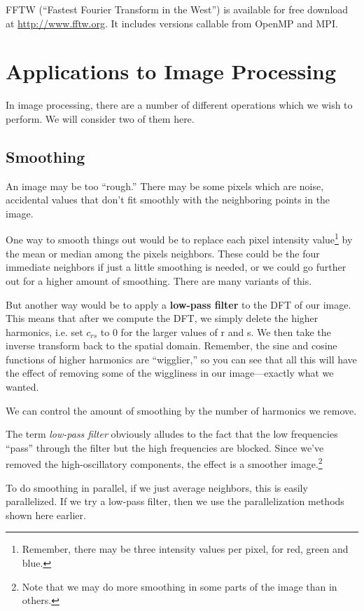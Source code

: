 FFTW (``Fastest Fourier Transform in the West'') is available for free
download at \url{http://www.fftw.org}.  It includes versions callable from
OpenMP and MPI.

\section{Applications to Image Processing}

In image processing, there are a number of different operations which we
wish to perform.  We will consider two of them here.

\subsection{Smoothing}
\label{smoothing}

An image may be too ``rough.''  There may be some pixels which are
noise, accidental values that don't fit smoothly with the neighboring
points in the image.

One way to smooth things out would be to replace each pixel intensity
value\footnote{Remember, there may be three intensity values per pixel,
for red, green and blue.} by the mean or median among the pixels
neighbors.  These could be the four immediate neighbors if just a little
smoothing is needed, or we could go further out for a higher amount of
smoothing.  There are many variants of this.

But another way would be to apply a {\bf low-pass filter} to the DFT of
our image.  This means that after we compute the DFT, we simply delete
the higher harmonics, i.e.  set $c_{rs}$ to 0 for the larger values of r
and s.  We then take the inverse transform back to the spatial domain.
Remember, the sine and cosine functions of higher harmonics are
``wigglier,'' so you can see that all this will have the effect 
of removing some of the wiggliness in our image---exactly what we
wanted.

We can control the amount of smoothing by the number of harmonics we
remove.

The term {\it low-pass filter} obviously alludes to the fact that the
low frequencies ``pass'' through the filter but the high frequencies are
blocked.  Since we've removed the high-oscillatory components, the
effect is a smoother image.\footnote{Note that we may do more smoothing
in some parts of the image than in others.}

To do smoothing in parallel, if we just average neighbors, this is
easily parallelized.  If we try a low-pass filter, then we use the
parallelization methods shown here earlier.

